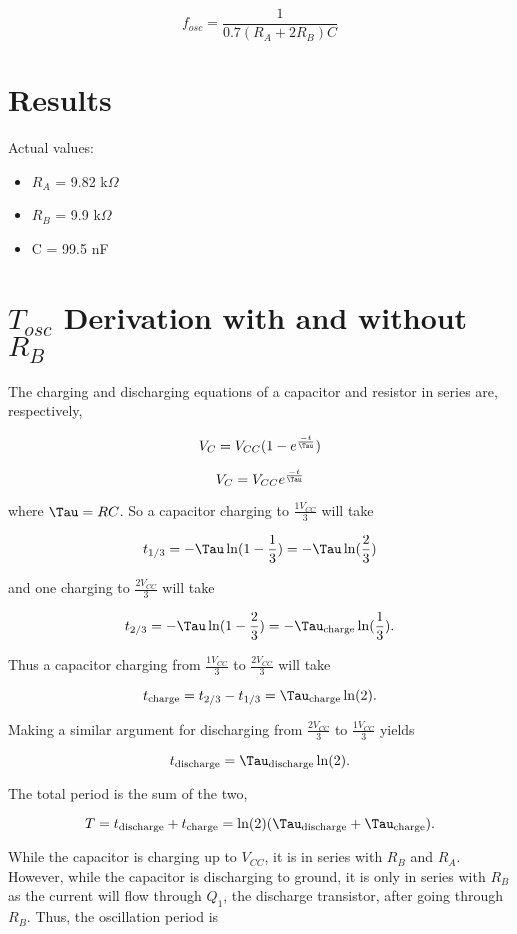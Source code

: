 \documentclass[12pt,letterpaper]{report}
\begin{document}
\begin{equation} \label{eq:frequency}
f_{osc}=\frac{1}{0.7(R_A + 2R_B)C}
\end{equation}

\section*{Results}

Actual values:
\begin{itemize}
\item $R_A$ = 9.82 k$\Omega$
\item $R_B$ = 9.9 k$\Omega$
\item C = 99.5 nF
\end{itemize}

\section*{$T_{osc}$ Derivation with and without $R_B$}
The charging and discharging equations of a capacitor and resistor in series are, respectively,

$$
V_C = V_{CC}(1-e^{\frac{-t}{\Tau}})
$$

$$
V_C = V_{CC}e^{\frac{-t}{\Tau}}
$$

where $\Tau = RC$. So a capacitor charging to $\frac{1V_{CC}}{3}$ will take

$$
t_{1/3} = -\Tau \ln (1 - \frac{1}{3}) = -\Tau \ln (\frac{2}{3})
$$

and one charging to $\frac{2V_{CC}}{3}$ will take

$$
t_{2/3} = -\Tau \ln (1 - \frac{2}{3}) = -\Tau_{\text{charge}} \ln (\frac{1}{3}).
$$

Thus a capacitor charging from $\frac{1V_{CC}}{3}$ to $\frac{2V_{CC}}{3}$ will take

$$
t_{\text{charge}} = t_{2/3} - t_{1/3} = \Tau_{\text{charge}} \ln (2).
$$

Making a similar argument for discharging from $\frac{2V_{CC}}{3}$ to $\frac{1V_{CC}}{3}$ yields

$$
t_{\text{discharge}} = \Tau_{\text{discharge}} \ln (2).
$$

The total period is the sum of the two,

$$
T = t_{\text{discharge}} + t_{\text{charge}} = \ln (2) (\Tau_{\text{discharge}} + \Tau_{\text{charge}}).
$$

While the capacitor is charging up to $V_{CC}$, it is in series with $R_B$ and $R_A$. However, while the capacitor is discharging to ground, it is only in series with $R_B$ as the current will flow through $Q_1$, the discharge transistor, after going through $R_B$. Thus, the oscillation period is
\end{document}
